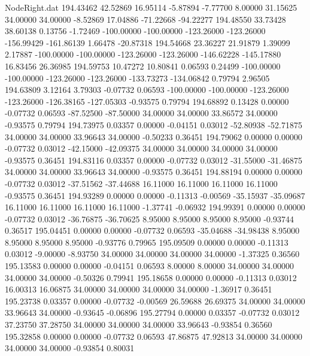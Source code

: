 \begin{filecontents}{NodeRight.dat}
 194.43462   42.52869   16.95114    -5.87894   -7.77700    8.00000   31.15625   34.00000   34.00000   -8.52869   17.04886  -71.22668  -94.22277
 194.48550   33.73428   38.60138     0.13756   -1.72469 -100.00000 -100.00000 -123.26000 -123.26000 -156.99429 -161.86139    1.66478  -20.87318
 194.54668   23.36227   21.91879     1.39099    2.17887 -100.00000 -100.00000 -123.26000 -123.26000 -146.62228 -145.17880   16.83456   26.36985
 194.59753   10.47272   10.80841     0.06593    0.24499 -100.00000 -100.00000 -123.26000 -123.26000 -133.73273 -134.06842    0.79794    2.96505
 194.63809    3.12164    3.79303    -0.07732    0.06593 -100.00000 -100.00000 -123.26000 -123.26000 -126.38165 -127.05303   -0.93575    0.79794
 194.68892    0.13428    0.00000    -0.07732    0.06593  -87.52500  -87.50000   34.00000   34.00000   33.86572   34.00000   -0.93575    0.79794
 194.73975    0.03357    0.00000    -0.04151    0.03012  -52.80938  -52.71875   34.00000   34.00000   33.96643   34.00000   -0.50233    0.36451
 194.79062    0.00000    0.00000    -0.07732    0.03012  -42.15000  -42.09375   34.00000   34.00000   34.00000   34.00000   -0.93575    0.36451
 194.83116    0.03357    0.00000    -0.07732    0.03012  -31.55000  -31.46875   34.00000   34.00000   33.96643   34.00000   -0.93575    0.36451
 194.88194    0.00000    0.00000    -0.07732    0.03012  -37.51562  -37.44688   16.11000   16.11000   16.11000   16.11000   -0.93575    0.36451
 194.93289    0.00000    0.00000    -0.11313   -0.00569  -35.15937  -35.09687   16.11000   16.11000   16.11000   16.11000   -1.37741   -0.06932
 194.99391    0.00000    0.00000    -0.07732    0.03012  -36.76875  -36.70625    8.95000    8.95000    8.95000    8.95000   -0.93744    0.36517
 195.04451    0.00000    0.00000    -0.07732    0.06593  -35.04688  -34.98438    8.95000    8.95000    8.95000    8.95000   -0.93776    0.79965
 195.09509    0.00000    0.00000    -0.11313    0.03012   -9.00000   -8.93750   34.00000   34.00000   34.00000   34.00000   -1.37325    0.36560
 195.13583    0.00000    0.00000    -0.04151    0.06593    8.00000    8.00000   34.00000   34.00000   34.00000   34.00000   -0.50326    0.79941
 195.18658    0.00000    0.00000    -0.11313    0.03012   16.00313   16.06875   34.00000   34.00000   34.00000   34.00000   -1.36917    0.36451
 195.23738    0.03357    0.00000    -0.07732   -0.00569   26.59688   26.69375   34.00000   34.00000   33.96643   34.00000   -0.93645   -0.06896
 195.27794    0.00000    0.03357    -0.07732    0.03012   37.23750   37.28750   34.00000   34.00000   34.00000   33.96643   -0.93854    0.36560
 195.32858    0.00000    0.00000    -0.07732    0.06593   47.86875   47.92813   34.00000   34.00000   34.00000   34.00000   -0.93854    0.80031

\end{filecontents}
